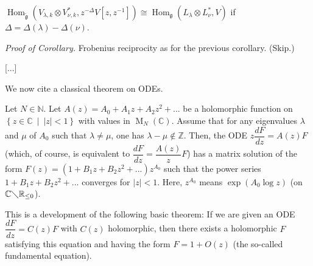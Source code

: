 \documentclass[etingof-lie.tex]{subfiles}
\begin{document}
\begin{corollary}
$\operatorname*{Hom}\nolimits_{\widetilde{\mathfrak{g}}}\left(  V_{\lambda
,k}\otimes V_{\nu,k}^{\ast},z^{-\Delta}V\left[  z,z^{-1}\right]  \right)
\cong\operatorname*{Hom}\nolimits_{\mathfrak{g}}\left(  L_{\lambda}\otimes
L_{\nu}^{\ast},V\right)  $ if $\Delta=\Delta\left(  \lambda\right)
-\Delta\left(  \nu\right)  $.
\end{corollary}

\textit{Proof of Corollary.} Frobenius reciprocity as for the previous
corollary. (Skip.)

[...]

We now cite a classical theorem on ODEs.

\begin{theorem}
Let $N\in\mathbb{N}$. Let $A\left(  z\right)  =A_{0}+A_{1}z+A_{2}z^{2}+...$ be
a holomorphic function on $\left\{  z\in\mathbb{C}\ \mid\ \left\vert
z\right\vert <1\right\}  $ with values in $\operatorname*{M}\nolimits_{N}%
\left(  \mathbb{C}\right)  $. Assume that for any eigenvalues $\lambda$ and
$\mu$ of $A_{0}$ such that $\lambda\neq\mu$, one has $\lambda-\mu
\notin\mathbb{Z}$. Then, the ODE $z\dfrac{dF}{dz}=A\left(  z\right)  F$
(which, of course, is equivalent to $\dfrac{dF}{dz}=\dfrac{A\left(  z\right)
}{z}F$) has a matrix solution of the form $F\left(  z\right)  =\left(
1+B_{1}z+B_{2}z^{2}+...\right)  z^{A_{0}}$ such that the power series
$1+B_{1}z+B_{2}z^{2}+...$ converges for $\left\vert z\right\vert <1$. Here,
$z^{A_{0}}$ means $\exp\left(  A_{0}\log z\right)  $ (on $\mathbb{C}%
\diagdown\mathbb{R}_{\leq0}$).
\end{theorem}

\begin{remark}
This is a development of the following basic theorem: If we are given an ODE
$\dfrac{dF}{dz}=C\left(  z\right)  F$ with $C\left(  z\right)  $ holomorphic,
then there exists a holomorphic $F$ satisfying this equation and having the
form $F=1+O\left(  z\right)  $ (the so-called fundamental equation).
\end{remark}
\end{document}
